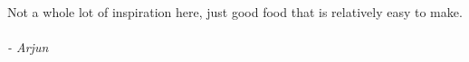 
Not a whole lot of inspiration here, just good food that is relatively easy to make. 
\\\\
\textit{- Arjun} 

